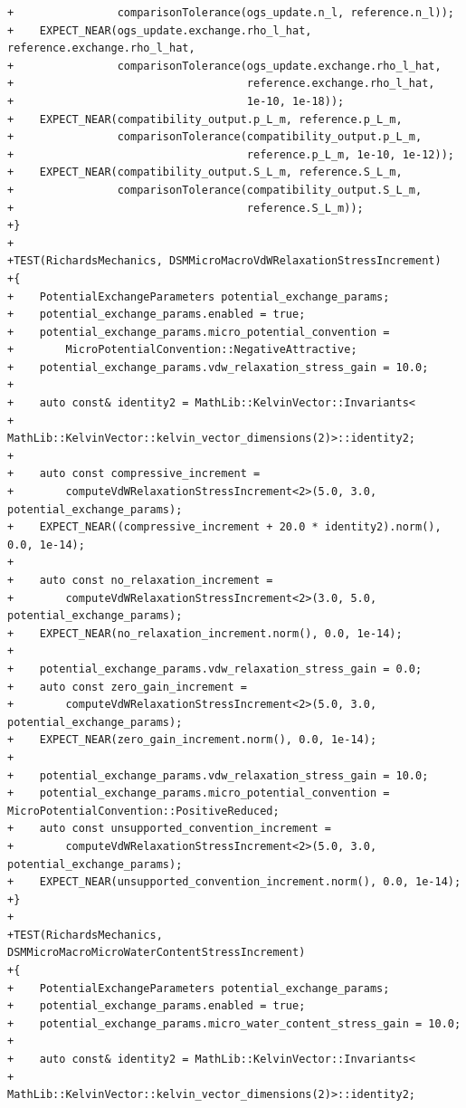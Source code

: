 \documentclass[10pt]{article}
\begin{document}
\begin{lstlisting}
+                comparisonTolerance(ogs_update.n_l, reference.n_l));
+    EXPECT_NEAR(ogs_update.exchange.rho_l_hat, reference.exchange.rho_l_hat,
+                comparisonTolerance(ogs_update.exchange.rho_l_hat,
+                                    reference.exchange.rho_l_hat,
+                                    1e-10, 1e-18));
+    EXPECT_NEAR(compatibility_output.p_L_m, reference.p_L_m,
+                comparisonTolerance(compatibility_output.p_L_m,
+                                    reference.p_L_m, 1e-10, 1e-12));
+    EXPECT_NEAR(compatibility_output.S_L_m, reference.S_L_m,
+                comparisonTolerance(compatibility_output.S_L_m,
+                                    reference.S_L_m));
+}
+
+TEST(RichardsMechanics, DSMMicroMacroVdWRelaxationStressIncrement)
+{
+    PotentialExchangeParameters potential_exchange_params;
+    potential_exchange_params.enabled = true;
+    potential_exchange_params.micro_potential_convention =
+        MicroPotentialConvention::NegativeAttractive;
+    potential_exchange_params.vdw_relaxation_stress_gain = 10.0;
+
+    auto const& identity2 = MathLib::KelvinVector::Invariants<
+        MathLib::KelvinVector::kelvin_vector_dimensions(2)>::identity2;
+
+    auto const compressive_increment =
+        computeVdWRelaxationStressIncrement<2>(5.0, 3.0, potential_exchange_params);
+    EXPECT_NEAR((compressive_increment + 20.0 * identity2).norm(), 0.0, 1e-14);
+
+    auto const no_relaxation_increment =
+        computeVdWRelaxationStressIncrement<2>(3.0, 5.0, potential_exchange_params);
+    EXPECT_NEAR(no_relaxation_increment.norm(), 0.0, 1e-14);
+
+    potential_exchange_params.vdw_relaxation_stress_gain = 0.0;
+    auto const zero_gain_increment =
+        computeVdWRelaxationStressIncrement<2>(5.0, 3.0, potential_exchange_params);
+    EXPECT_NEAR(zero_gain_increment.norm(), 0.0, 1e-14);
+
+    potential_exchange_params.vdw_relaxation_stress_gain = 10.0;
+    potential_exchange_params.micro_potential_convention = MicroPotentialConvention::PositiveReduced;
+    auto const unsupported_convention_increment =
+        computeVdWRelaxationStressIncrement<2>(5.0, 3.0, potential_exchange_params);
+    EXPECT_NEAR(unsupported_convention_increment.norm(), 0.0, 1e-14);
+}
+
+TEST(RichardsMechanics, DSMMicroMacroMicroWaterContentStressIncrement)
+{
+    PotentialExchangeParameters potential_exchange_params;
+    potential_exchange_params.enabled = true;
+    potential_exchange_params.micro_water_content_stress_gain = 10.0;
+
+    auto const& identity2 = MathLib::KelvinVector::Invariants<
+        MathLib::KelvinVector::kelvin_vector_dimensions(2)>::identity2;

\end{lstlisting}
\end{document}
